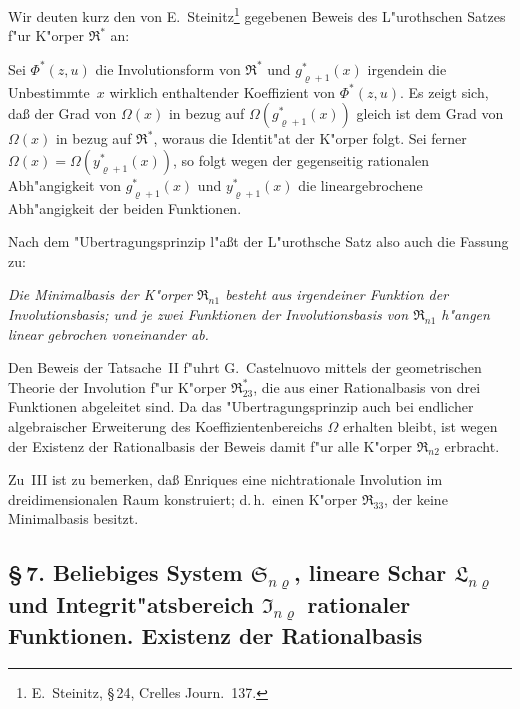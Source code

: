 \documentclass[11pt,a4paper]{article}
\begin{document}
Wir deuten kurz den von E.~Steinitz\footnote{E.~Steinitz, \S\,24, Crelles
Journ.\ 137.} gegebenen Beweis des L"{u}rothschen Satzes f"{u}r K"{o}rper $\mathfrak{R}^{*}$ an:

Sei $\Phi^{*}(z,u)$ die Involutionsform von $\mathfrak{R}^{*}$ und $g_{\varrho+1}^{*}(x)$ irgendein die
Unbestimmte~$x$ wirklich enthaltender Koeffizient von $\Phi^{*}(z,u)$. Es zeigt sich,
da\ss{} der Grad von $\Omega(x)$ in bezug auf $\Omega(g_{\varrho+1}^{*}(x))$ gleich ist dem Grad von
$\Omega(x)$ in bezug auf $\mathfrak{R}^{*}$, woraus die Identit"{a}t der K"{o}rper folgt. Sei ferner
$\Omega(x)=\Omega(y_{\varrho+1}^{*}(x))$, so folgt wegen der gegenseitig rationalen Abh"{a}ngigkeit
von $g_{\varrho+1}^{*}(x)$ und $y_{\varrho+1}^{*}(x)$ die lineargebrochene Abh"{a}ngigkeit der beiden Funktionen.

Nach dem "{U}bertragungsprinzip l"{a}\ss{}t der L"{u}rothsche Satz also auch
die Fassung zu:

\smallskip
\emph{Die Minimalbasis der K"{o}rper $\mathfrak{R}_{n1}$ besteht aus irgendeiner Funktion
der Involutionsbasis; und je zwei Funktionen der Involutionsbasis von $\mathfrak{R}_{n1}$
h"{a}ngen linear gebrochen voneinander ab.}

Den Beweis der Tatsache~II f"{u}hrt G.~Castelnuovo mittels der geometrischen
Theorie der Involution f"{u}r K"{o}rper $\mathfrak{R}_{23}^{*}$, die aus einer Rationalbasis von
drei Funktionen abgeleitet sind. Da das "{U}bertragungsprinzip auch bei endlicher
algebraischer Erweiterung des Koeffizientenbereichs $\Omega$ erhalten bleibt,
ist wegen der Existenz der Rationalbasis der Beweis damit f"{u}r alle K"{o}rper $\mathfrak{R}_{n2}$ erbracht.

Zu~III ist zu bemerken, da\ss{} Enriques eine nichtrationale Involution
im dreidimensionalen Raum konstruiert; d.\,h.\ einen K"{o}rper $\mathfrak{R}_{33}$, der keine
Minimalbasis besitzt.


\subsection*{\S\,7. Beliebiges System $\mathfrak{S}_{n\varrho}$, lineare Schar $\mathfrak{L}_{n\varrho}$ und Integrit"{a}tsbereich $\mathfrak{I}_{n\varrho}$ rationaler Funktionen. Existenz der Rationalbasis}
\end{document}
